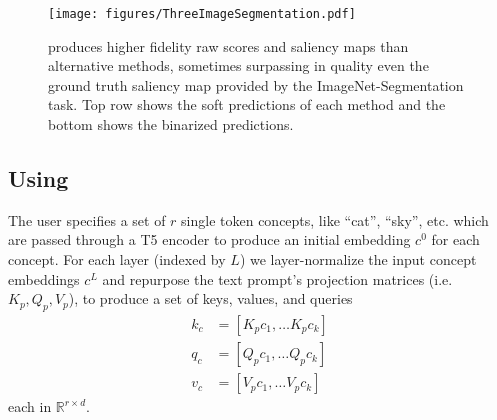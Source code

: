 


\begin{figure*}[t]
    \centering
    \texttt{[image: figures/ThreeImageSegmentation.pdf]}
    \vspace{-0.2in}
    \caption{\tool{} produces higher fidelity raw scores and saliency maps than alternative methods, sometimes surpassing in quality even the ground truth saliency map provided by the ImageNet-Segmentation task. Top row shows the soft predictions of each method and the bottom shows the binarized predictions. }
    \label{fig:segmentation_qualitative_results}
\end{figure*}

\subsection{Using \tool{}}


The user specifies a set of $r$ single token concepts, like ``cat'', ``sky'', etc. which are passed through a T5 encoder to produce an initial embedding $c^0$ for each concept. 
For each \layername{} layer (indexed by $L$) we layer-normalize the input concept embeddings $c^L$ and repurpose the text prompt's projection matrices (i.e. $K_p, Q_p, V_p$), to produce a set of keys, values, and queries 
\begin{align}
    k_c &= [K_p c_1 , \dots K_p c_k] \\ 
    q_c &= [Q_p c_1 , \dots Q_p c_k] \\
    v_c &= [V_p c_1 , \dots V_p c_k]
\end{align}
each in $\mathbb{R}^{r \times d}$. 

